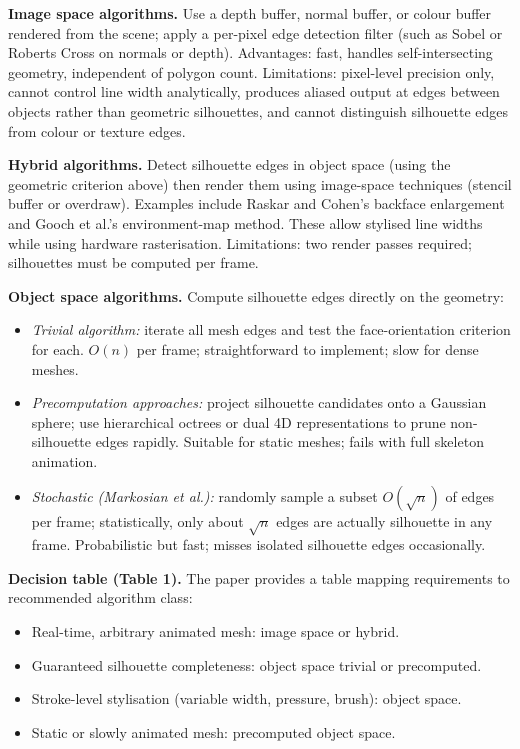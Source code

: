\documentclass[11pt, a4paper]{article}
\begin{document}
\textbf{Image space algorithms.} Use a depth buffer, normal buffer, or colour buffer rendered from the scene; apply a per-pixel edge detection filter (such as Sobel or Roberts Cross on normals or depth). Advantages: fast, handles self-intersecting geometry, independent of polygon count. Limitations: pixel-level precision only, cannot control line width analytically, produces aliased output at edges between objects rather than geometric silhouettes, and cannot distinguish silhouette edges from colour or texture edges.

\textbf{Hybrid algorithms.} Detect silhouette edges in object space (using the geometric criterion above) then render them using image-space techniques (stencil buffer or overdraw). Examples include Raskar and Cohen's backface enlargement and Gooch et al.'s environment-map method. These allow stylised line widths while using hardware rasterisation. Limitations: two render passes required; silhouettes must be computed per frame.

\textbf{Object space algorithms.} Compute silhouette edges directly on the geometry:
\begin{itemize}[leftmargin=2em]
  \item \textit{Trivial algorithm:} iterate all mesh edges and test the face-orientation criterion for each. $O(n)$ per frame; straightforward to implement; slow for dense meshes.
  \item \textit{Precomputation approaches:} project silhouette candidates onto a Gaussian sphere; use hierarchical octrees or dual 4D representations to prune non-silhouette edges rapidly. Suitable for static meshes; fails with full skeleton animation.
  \item \textit{Stochastic (Markosian et al.):} randomly sample a subset $O(\sqrt{n})$ of edges per frame; statistically, only about $\sqrt{n}$ edges are actually silhouette in any frame. Probabilistic but fast; misses isolated silhouette edges occasionally.
\end{itemize}

\textbf{Decision table (Table 1).} The paper provides a table mapping requirements to recommended algorithm class:
\begin{itemize}[leftmargin=2em]
  \item Real-time, arbitrary animated mesh: image space or hybrid.
  \item Guaranteed silhouette completeness: object space trivial or precomputed.
  \item Stroke-level stylisation (variable width, pressure, brush): object space.
  \item Static or slowly animated mesh: precomputed object space.
\end{itemize}
\end{document}

